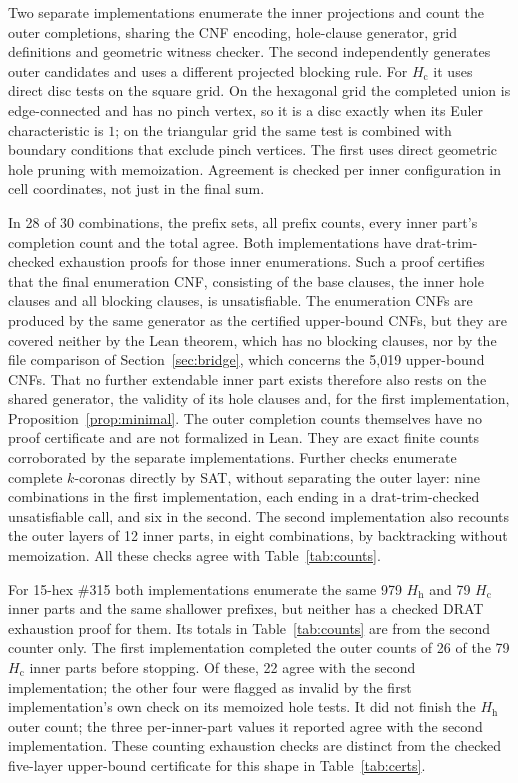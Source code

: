 \documentclass[10pt,a4paper]{article}
\theoremstyle{definition}
\theoremstyle{remark}
\newcommand{\Hc}{H_{\mathrm c}}
\newcommand{\Hh}{H_{\mathrm h}}
\begin{document}
Two separate implementations enumerate the inner projections and count
the outer completions, sharing the CNF encoding, hole-clause generator,
grid definitions and geometric witness checker. The second independently
generates outer candidates and uses a different projected blocking rule.
For $\Hc$ it uses direct disc tests on the square grid. On the
hexagonal grid the completed union is edge-connected and has no pinch
vertex, so it is a disc exactly when its Euler characteristic is $1$;
on the triangular grid the same test is combined with boundary
conditions that exclude pinch vertices.
The first uses direct geometric hole pruning with memoization. Agreement
is checked per inner configuration in cell coordinates, not just in
the final sum.

In 28 of 30 combinations, the prefix sets, all prefix counts, every
inner part's completion count and the total agree. Both implementations
have drat-trim-checked exhaustion proofs for those inner enumerations.
Such a proof certifies that the final enumeration CNF, consisting of the
base clauses, the inner hole clauses and all blocking clauses, is
unsatisfiable. The enumeration CNFs are produced by the same generator as
the certified upper-bound CNFs, but they are covered neither by the Lean
theorem, which has no blocking clauses, nor by the file comparison of
Section~\ref{sec:bridge}, which concerns the 5,019 upper-bound CNFs.
That no further extendable inner part exists therefore also rests on
the shared generator, the validity of its hole clauses and, for the
first implementation, Proposition~\ref{prop:minimal}.
The outer completion counts themselves have no proof certificate and
are not formalized in Lean. They are exact finite counts corroborated
by the separate implementations. Further checks enumerate complete
$k$-coronas directly by SAT, without separating the outer layer: nine
combinations in the first implementation, each ending in a
drat-trim-checked unsatisfiable call, and six in the second. The second
implementation also recounts the outer layers of 12 inner parts, in
eight combinations, by backtracking without memoization. All these
checks agree with Table~\ref{tab:counts}.

For 15-hex \#315 both implementations enumerate the same 979 $\Hh$
and 79 $\Hc$ inner parts and the same shallower prefixes, but neither
has a checked DRAT exhaustion proof for them. Its totals in
Table~\ref{tab:counts} are from the second counter only. The first
implementation completed the outer counts of 26 of the 79 $\Hc$ inner
parts before stopping. Of these, 22 agree with the second
implementation; the other four were flagged as invalid by the first
implementation's own check on its memoized hole tests. It did not finish
the $\Hh$ outer count; the three per-inner-part values it reported agree
with the second implementation. These counting
exhaustion checks are distinct from the checked five-layer upper-bound
certificate for this shape in Table~\ref{tab:certs}.
\end{document}
